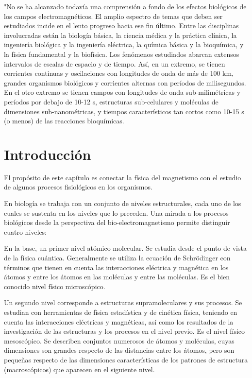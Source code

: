 "No se ha alcanzado todavía una comprensión a fondo de los efectos biológicos de los campos electromagnéticos. El amplio espectro de temas que deben ser estudiados incide en el lento progreso hacia ese fin último. Entre las disciplinas involucradas están la biología básica, la ciencia médica y la práctica clínica, la ingeniería biológica y la ingeniería eléctrica, la química básica y la bioquímica, y la física fundamental y la biofísica. Los fenómenos estudiados abarcan extensos intervalos de escalas de espacio y de tiempo. Así, en un extremo, se tienen corrientes continuas y oscilaciones con longitudes de onda de más de 100 km, grandes organismos biológicos y corrientes alternas con períodos de milisegundos. En el otro extremo se tienen campos con longitudes de onda sub-milimétricas y períodos por debajo de 10-12 s, estructuras sub-celulares y moléculas de dimensiones sub-nanométricas, y tiempos característicos tan cortos como 10-15 s (o menos) de las reacciones bioquímicas\citep{Greenbaum}.

\section{Introducción}

El propósito de este capítulo es conectar la física del magnetismo con el estudio de algunos procesos fisiológicos en los organismos.

En biología se trabaja con un conjunto de niveles estructurales, cada uno de los cuales se sustenta en los niveles que lo preceden. Una mirada a los procesos biológicos desde la perspectiva del bio-electromagnetismo permite distinguir cuatro niveles:

En la base, un primer nivel atómico-molecular. Se estudia desde el punto de vista de la física cuántica. Generalmente se utiliza la ecuación de Schrödinger con términos que tienen en cuenta las interacciones eléctrica y magnética en los átomos y entre los átomos en las moléculas y entre las moléculas. Es el bien conocido nivel físico microscópico.

Un segundo nivel corresponde a estructuras supramoleculares y sus procesos.
Se estudian con herramientas de física estadística y de cinética física, teniendo en cuenta las interacciones eléctricas y magnéticas, así como los resultados de la investigación de las estructuras y los procesos en el nivel previo. Es el nivel físico mesoscópico. Se describen conjuntos numerosos de átomos y moléculas, cuyas dimensiones son grandes respecto de las distancias entre los átomos, pero son pequeñas respecto de las dimensiones características de los patrones de estructura (macroscópicos) que aparecen en el siguiente nivel.

